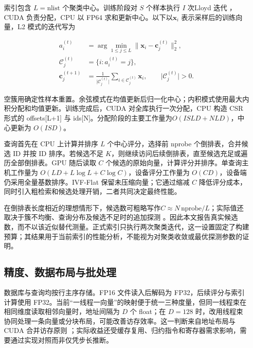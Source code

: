 \documentclass[UTF8,a4paper,zihao=5,fontset=none]{ctexart}
\begin{document}
索引包含 $L=\mathrm{nlist}$ 个聚类中心。训练阶段对 $S$ 个样本执行 $I$ 次Lloyd 迭代 \cite{r8}，CUDA 负责分配，CPU 以 FP64 求和更新中心。以下以$\boldsymbol{x}_i$ 表示采样后的训练向量，L2 模式的迭代写为


\nopagebreak[4]
\begin{equation}
\label{eq:2}
\begin{aligned}
a_i^{(t)} &= \arg\min_{1\le j\le L}
  \lVert\boldsymbol{x}_i-\boldsymbol{c}_j^{(t)}\rVert_2^2,\\
\mathcal{C}_j^{(t)} &= \{i:a_i^{(t)}=j\},\\
\boldsymbol{c}_j^{(t+1)} &=
  \frac{1}{\lvert\mathcal{C}_j^{(t)}\rvert}
  \sum_{i\in\mathcal{C}_j^{(t)}}\boldsymbol{x}_i,
  \qquad \lvert\mathcal{C}_j^{(t)}\rvert>0.
\end{aligned}
\end{equation}

空簇用确定性样本重置。余弦模式在均值更新后归一化中心；内积模式使用最大内积分配和均值更新。训练完成后，CUDA 对全库执行一次分配，CPU 构造 CSR形式的 {\small\ttfamily offsets[L+1]} 与 {\small\ttfamily ids[N]}。分配阶段的主要工作量为$O(ISLD+NLD)$，中心更新为 $O(ISD)$。


查询首先在 CPU 上计算并排序 $L$ 个中心评分，选择前 {\small\ttfamily nprobe} 个倒排表，合并候选 ID 并按 ID 排序。若候选不足 $K$，则继续访问后续倒排表，直至候选充足或遍历全部倒排表。GPU 随后读取 $C$ 个候选的原始向量，计算评分并排序。单查询主机工作量为 $O(LD+L\log L+C\log C)$，设备评分工作量为 $O(CD)$，设备端仍采用全量基数排序。IVF-Flat 保留未压缩向量；它通过缩减 $C$ 降低评分成本，同时引入粗检索和候选处理开销，二者共同决定最终性能。


在倒排表长度相近的理想情形下，候选数可粗略写作$C\approx N\,\mathrm{nprobe}/L$；实际值还取决于簇不均衡、查询分布及候选不足时的追加探测 \cite{r2}。因此本文报告真实候选数，而不以该近似替代测量。正式索引只执行两次聚类迭代，这一设置固定了构建预算；其结果用于当前索引的性能分析，不能视为对聚类收敛或最优探测参数的证明。


\subsection{精度、数据布局与批处理}

数据库与查询均按行主序存储。FP16 文件读入后解码为 FP32，后续评分与索引计算使用 FP32。当前“一线程一向量”的映射便于统一三种度量，但同一线程束在相同维度读取相邻向量时，地址间隔为 $D$ 个 float；在 $D=128$ 时，改用线程束协同处理一条向量或分块布局，可能改善访存效率。这一判断来自地址布局与 CUDA 合并访存原则 \cite{r9}；实际收益还受缓存复用、归约指令和寄存器需求影响，需要通过实现对照而非仅凭步长推断。
\end{document}

